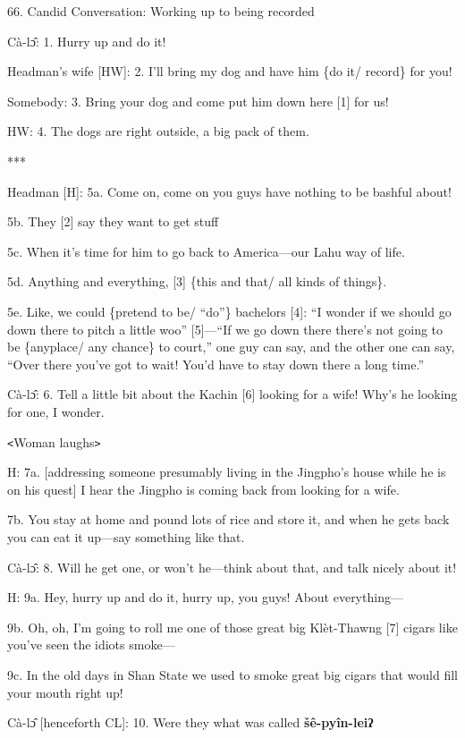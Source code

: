 
66. Candid Conversation: Working up to being recorded

Cà-lɔ̂: 1. Hurry up and do it!

Headman's wife [HW]: 2. I'll bring my dog and have him \{do it/ record\} for you!

Somebody: 3. Bring your dog and come put him down here [1] for us!

HW: 4. The dogs are right outside, a big pack of them.

***

Headman [H]: 5a. Come on, come on you guys have nothing to be bashful about!

5b. They [2] say they want to get stuff

5c. When it's time for him to go back to America---our Lahu way of life.

5d. Anything and everything, [3] \{this and that/ all kinds of things\}.

5e. Like, we could \{pretend to be/ ``do''\} bachelors [4]: ``I wonder if we should
go down there to pitch a little woo'' [5]---``If we go down there there's not going
to be \{anyplace/ any chance\} to court,'' one guy can say, and the other one can
say, ``Over there you've got to wait! You'd have to stay down there a long time.''

Cà-lɔ̂: 6. Tell a little bit about the Kachin [6] looking for a wife!  Why's
he looking for one, I wonder.

\texttt{<}Woman laughs\texttt{>}

H: 7a. [addressing someone presumably living in the Jingpho's house while he is
on his quest] I hear the Jingpho is coming back from looking for a wife.

7b. You stay at home and pound lots of rice and store it, and when he gets back
you can eat it up---say something like that.

Cà-lɔ̂: 8. Will he get one, or won't he---think about that, and talk nicely
about it!

H: 9a. Hey, hurry up and do it, hurry up, you guys! About everything---

9b. Oh, oh, I'm going to roll me one of those great big Klèt-Thawng [7] cigars
like you've seen the idiots smoke---

9c. In the old days in Shan State we used to smoke great big cigars that would
fill your mouth right up!

Cà-lɔ̂ [henceforth CL]: 10. Were they what was called \textbf{šê-pyîn-leiʔ}
